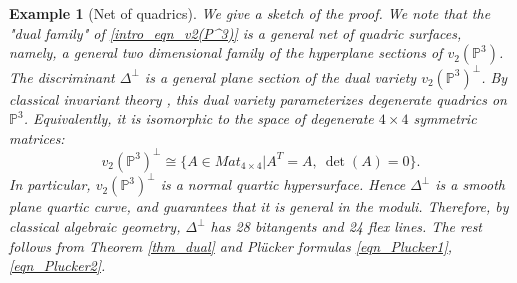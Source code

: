\documentclass[12pt]{amsart}
\newtheorem{proposition}[theorem]{Proposition}
\newtheorem{example}[theorem]{Example}
\begin{document}
\begin{example}[Net of quadrics]
We give a sketch of the proof. We note that the "dual family" of \eqref{intro_eqn_v2(P^3)} is a general net of quadric surfaces, namely, a general two dimensional family of the hyperplane sections of $v_2(\mathbb P^3)$. The discriminant $\Delta^{\perp}$ is a general plane section of the dual variety $v_2(\mathbb P^3)^{\perp}$. By classical invariant theory  \cite[p.16]{Dolgachev-classicalAG}, this dual variety parameterizes degenerate quadrics on $\mathbb P^3$. Equivalently, it is isomorphic to the space of degenerate $4\times 4$ symmetric matrices:
\begin{equation*}\label{eqn_quartic-hypersurface}
    v_2(\mathbb P^3)^{\perp}\cong \{A\in Mat_{4\times 4}|A^T=A,\ \det(A)=0\}.
\end{equation*}
 In particular, $v_2(\mathbb P^3)^{\perp}$ is a normal quartic hypersurface. Hence $\Delta^{\perp}$ is a smooth plane quartic curve, and \cite{Ter10} guarantees that it is general in the moduli. Therefore, by classical algebraic geometry, $\Delta^{\perp}$ has 28 bitangents and 24 flex lines. The rest follows from Theorem \ref{thm_dual} and Pl\"ucker formulas \eqref{eqn_Plucker1}, \eqref{eqn_Plucker2}.
 \end{example}

\end{document}
